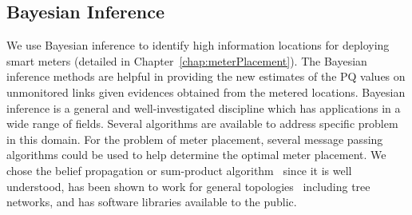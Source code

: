 \subsection{Bayesian Inference}
We use Bayesian inference to identify high information locations for deploying smart meters (detailed in Chapter~\ref{chap:meterPlacement}). The Bayesian inference methods are helpful in providing the new estimates of the PQ values on unmonitored links given evidences obtained from the metered locations. Bayesian inference is a general and well-investigated discipline which has applications in a wide range of fields. Several algorithms are available to address specific problem in this domain. For the problem of meter placement, several message passing algorithms could be used to
help determine the optimal meter placement. We chose the belief propagation or sum-product algorithm~\cite{pearl1988probabilistic} since it is well understood, has been shown to work for general topologies~\cite{yedidia2001generalized} including tree networks, and has software libraries available to the public.